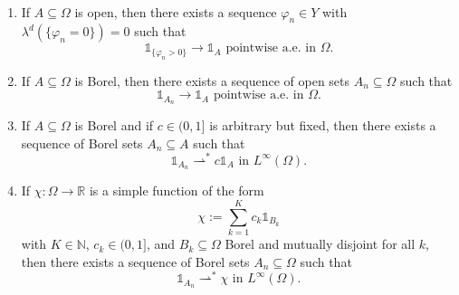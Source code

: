 \documentclass[reqno]{shinyart}
\begin{document}
\begin{lemma}\label{lem:approx}\ 
    \begin{enumerate}[label=(\roman*)]
        \item\label{it:approxopen}
            If $A\subseteq \Omega$ is open, then there exists a sequence 
            $\varphi_n \in Y$ with $\lambda^d(\{\varphi_n = 0\})=0$ such that 
            \begin{equation*}
                \mathbb{1}_{\{\varphi_n > 0\}} \to \mathbb{1}_{A}\text{ pointwise a.e.\ in }\Omega.
            \end{equation*}
        \item\label{it:approxborel}
            If $A\subseteq \Omega$ is Borel, 
            then there exists a sequence of open sets $A_n \subseteq \Omega$ such that
            \begin{equation*}
                \mathbb{1}_{A_n} \to  \mathbb{1}_{A}\text{ pointwise a.e.\ in }\Omega. 
            \end{equation*}
        \item\label{it:approxborelweight}
            If $A\subseteq \Omega$ is Borel and if $c \in (0, 1]$ is arbitrary but fixed, 
            then there exists a sequence of Borel sets $A_n \subseteq A$ such that
            \begin{equation*}
                \mathbb{1}_{A_n} {\rightharpoonup}^{*}   c\mathbb{1}_{A}\text{ in } L^\infty(\Omega). 
            \end{equation*}
        \item\label{it:approxsimple}
            If $\chi : \Omega \to {\mathbb{R}}$ is a simple function of the form 
            \begin{equation*}
                \chi := \sum_{k=1}^K c_k \mathbb{1}_{B_k}
            \end{equation*}
            with $K\in{\mathbb{N}}$, $c_k \in (0, 1]$,
            and $B_k \subseteq \Omega$ Borel and mutually disjoint for all $k$, 
            then there exists a sequence of Borel sets $A_n \subseteq \Omega$ such that
            \begin{equation*}
                \mathbb{1}_{A_n} {\rightharpoonup}^{*} \chi \text{ in }L^\infty(\Omega).
            \end{equation*}
    \end{enumerate}
\end{lemma}
\end{document}
